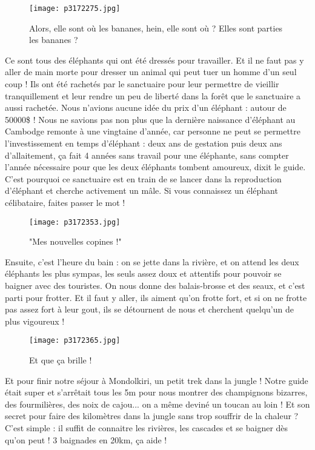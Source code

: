 \documentclass{book}
\begin{document}
\begin{figure}[h]
\centering
\texttt{[image: p3172275.jpg]}
\caption*{Alors, elle sont où les bananes, hein, elle sont où ? Elles sont parties les bananes ?}
\end{figure}

Ce sont tous des éléphants qui ont été dressés pour travailler. Et il ne faut pas y aller de main morte pour dresser un animal qui peut tuer un homme d'un seul coup ! Ils ont été rachetés par le sanctuaire pour leur permettre de vieillir tranquillement et leur rendre un peu de liberté dans la forêt que le sanctuaire a aussi rachetée. Nous n'avions aucune idée du prix d'un éléphant : autour de 50000\$ ! Nous ne savions pas non plus que la dernière naissance d'éléphant au Cambodge remonte à une vingtaine d'année, car personne ne peut se permettre l'investissement en temps d'éléphant : deux ans de gestation puis deux ans d'allaitement, ça fait 4 années sans travail pour une éléphante, sans compter l'année nécessaire pour que les deux éléphants tombent amoureux, dixit le guide. C'est pourquoi ce sanctuaire est en train de se lancer dans la reproduction d'éléphant et cherche activement un mâle. Si vous connaissez un éléphant célibataire, faites passer le mot !


\begin{figure}[h]
\centering
\texttt{[image: p3172353.jpg]}
\caption*{"Mes nouvelles copines !"}
\end{figure}

Ensuite, c'est l'heure du bain : on se jette dans la rivière, et on attend les deux éléphants les plus sympas, les seuls assez doux et attentifs pour pouvoir se baigner avec des touristes. On nous donne des balais-brosse et des seaux, et c'est parti pour frotter. Et il faut y aller, ils aiment qu'on frotte fort, et si on ne frotte pas assez fort à leur gout, ils se détournent de nous et cherchent quelqu'un de plus vigoureux !


\begin{figure}[h]
\centering
\texttt{[image: p3172365.jpg]}
\caption*{Et que ça brille !}
\end{figure}

Et pour finir notre séjour à Mondolkiri, un petit trek dans la jungle ! Notre guide était super et s'arrêtait tous les 5m pour nous montrer des champignons bizarres, des fourmilières, des noix de cajou... on a même deviné un toucan au loin ! Et son secret pour faire des kilomètres dans la jungle sans trop souffrir de la chaleur ? C'est simple : il suffit de connaitre les rivières, les cascades et se baigner dès qu'on peut ! 3 baignades en 20km, ça aide !
\end{document}

